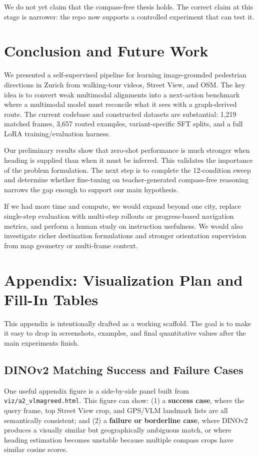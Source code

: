 \documentclass[10pt,twocolumn,letterpaper]{article}
\begin{document}
We do not yet claim that the compass-free thesis holds. The correct claim at this stage is narrower: the repo now supports a controlled experiment that can test it.

\section{Conclusion and Future Work}
We presented a self-supervised pipeline for learning image-grounded pedestrian directions in Zurich from walking-tour videos, Street View, and OSM. The key idea is to convert weak multimodal alignments into a next-action benchmark where a multimodal model must reconcile what it sees with a graph-derived route. The current codebase and constructed datasets are substantial: 1,219 matched frames, 3,657 routed examples, variant-specific SFT splits, and a full LoRA training/evaluation harness.

Our preliminary results show that zero-shot performance is much stronger when heading is supplied than when it must be inferred. This validates the importance of the problem formulation. The next step is to complete the 12-condition sweep and determine whether fine-tuning on teacher-generated compass-free reasoning narrows the gap enough to support our main hypothesis.

If we had more time and compute, we would expand beyond one city, replace single-step evaluation with multi-step rollouts or progress-based navigation metrics, and perform a human study on instruction usefulness. We would also investigate richer destination formulations and stronger orientation supervision from map geometry or multi-frame context.

\appendix
\section{Appendix: Visualization Plan and Fill-In Tables}
This appendix is intentionally drafted as a working scaffold. The goal is to make it easy to drop in screenshots, examples, and final quantitative values after the main experiments finish.

\subsection{DINOv2 Matching Success and Failure Cases}
One useful appendix figure is a side-by-side panel built from \texttt{viz/a2\_vlmagreed.html}. This figure can show: (1) a \textbf{success case}, where the query frame, top Street View crop, and GPS/VLM landmark lists are all semantically consistent; and (2) a \textbf{failure or borderline case}, where DINOv2 produces a visually similar but geographically ambiguous match, or where heading estimation becomes unstable because multiple compass crops have similar cosine scores.
\end{document}
